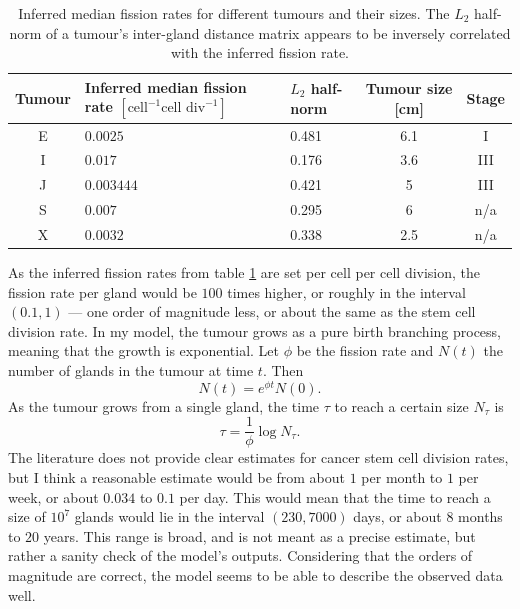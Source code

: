 \begin{table}[ht]
    \centering
    \begin{tabularx}{\textwidth}{|c|X|X|c|c|}
    \hline
    Tumour & Inferred median fission rate $[\text{cell}^{-1}\text{cell div}^{-1}]$ & $L_2$ half-norm & Tumour size [cm] & Stage \\
    \hline
    E & $0.0025$ & 0.481 & 6.1 & I \\
    \hline
    I & $0.017$ & 0.176 & 3.6 & III \\
    \hline
    J & $0.003444$ & 0.421 & 5 & III \\
    \hline
    S & $0.007$ & 0.295 & 6 & n/a \\
    \hline
    X & $0.0032$ & 0.338 & 2.5 & n/a \\
    \hline
    \end{tabularx}
    \caption{Inferred median fission rates for different tumours and their
    sizes. The $L_2$ half-norm of a tumour's inter-gland distance matrix appears
    to be inversely correlated with the inferred fission rate.}
    \label{tab:fission_rates}
\end{table}

As the inferred fission rates from table \ref{tab:fission_rates} are set per
cell per cell division, the fission rate per gland would be $100$ times higher,
or roughly in the interval $(0.1, 1)$ --- one order of magnitude less, or about
the same as the stem cell division rate. In my model, the tumour grows as a pure
birth branching process, meaning that the growth is exponential. Let $\phi$ be
the fission rate and $N(t)$ the number of glands in the tumour at time $t$. Then
\begin{equation}
    N(t) = e^{\phi t}N(0).
\end{equation}
As the tumour grows from a single gland, the time $\tau$ to reach a certain
size $N_\tau$ is
\begin{equation}
    \tau = \frac{1}{\phi}\log N_\tau.
\end{equation}
The literature does not provide clear estimates for cancer stem cell division
rates, but I think a reasonable estimate would be from about $1$ per month to
$1$ per week, or about $0.034$ to $0.1$ per day. This would mean that the time
to reach a size of $10^7$ glands would lie in the interval $(230, 7000)$ days,
or about $8$ months to $20$ years. This range is broad, and is not meant as a
precise estimate, but rather a sanity check of the model's outputs. Considering
that the orders of magnitude are correct, the model seems to be able to describe
the observed data well.

